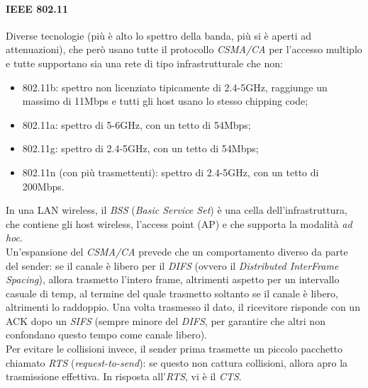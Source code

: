 \paragraph{IEEE 802.11}
Diverse tecnologie (più è alto lo spettro della banda, più si è aperti ad attenuazioni), che però usano tutte il protocollo \textit{CSMA/CA} per l'accesso multiplo e tutte supportano sia una rete di tipo infrastrutturale che non:
\begin{itemize}
	\item 802.11b: spettro non licenziato tipicamente di 2.4-5GHz, raggiunge un massimo di 11Mbps e tutti gli host usano lo stesso chipping code;
	\item 802.11a: spettro di 5-6GHz, con un tetto di 54Mbps;
	\item 802.11g: spettro di 2.4-5GHz, con un tetto di 54Mbps;
	\item 802.11n (con più trasmettenti): spettro di 2.4-5GHz, con un tetto di 200Mbps.
\end{itemize}

In una LAN wireless, il \textit{BSS} (\textit{Basic Service Set}) è una cella dell'infrastruttura, che contiene gli host wireless, l'access point (AP) e che supporta la modalità \textit{ad hoc}. \\
Un'espansione del \textit{CSMA/CA} prevede che un comportamento diverso da parte del sender: se il canale è libero per il \textit{DIFS} (ovvero il \textit{Distributed InterFrame Spacing}), allora trasmetto l'intero frame, altrimenti aspetto per un intervallo casuale di temp, al termine del quale trasmetto soltanto se il canale è libero, altrimenti lo raddoppio. Una volta trasmesso il dato, il ricevitore risponde con un ACK dopo un \textit{SIFS} (sempre minore del \textit{DIFS}, per garantire che altri non confondano questo tempo come canale libero). \\
Per evitare le collisioni invece, il sender prima trasmette un piccolo pacchetto chiamato \textit{RTS} (\textit{request-to-send}): se questo non cattura collisioni, allora apro la trasmissione effettiva. In risposta all'\textit{RTS}, vi è il \textit{CTS}.